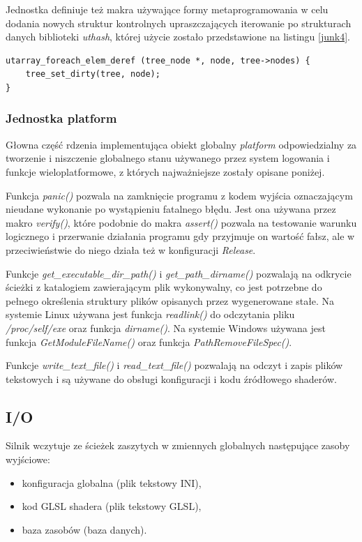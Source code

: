 Jednostka definiuje też makra używające formy metaprogramowania w celu dodania nowych struktur kontrolnych \cite{METACONTROLC} upraszczających iterowanie po strukturach danych biblioteki \textit{uthash}, której użycie zostało przedstawione na listingu \ref{junk4}.
\lstset{language=C}
\begin{lstlisting}[caption={Przykład iteracji używając makra utarray\_foreach\_elem\_deref},captionpos=b,label={junk4}]
utarray_foreach_elem_deref (tree_node *, node, tree->nodes) {
	tree_set_dirty(tree, node);
}
\end{lstlisting}


\subsubsection{Jednostka platform}
Głowna część rdzenia implementująca obiekt globalny \textit{platform} odpowiedzialny za tworzenie i niszczenie globalnego stanu używanego przez system logowania i funkcje wieloplatformowe, z których najważniejsze zostały opisane poniżej.

Funkcja \textit{panic()} pozwala na zamknięcie programu z kodem wyjścia oznaczającym nieudane wykonanie po wystąpieniu fatalnego błędu.
Jest ona używana przez makro \textit{verify()}, które podobnie do makra \textit{assert()} pozwala na testowanie warunku logicznego i przerwanie działania programu gdy przyjmuje on wartość fałsz, ale w przeciwieństwie do niego działa też w konfiguracji \textit{Release}.

Funkcje \textit{get\_executable\_dir\_path()} i \textit{get\_path\_dirname()} pozwalają na odkrycie ścieżki z katalogiem zawierającym plik wykonywalny, co jest potrzebne do pełnego określenia struktury plików opisanych przez wygenerowane stałe.
Na systemie Linux używana jest funkcja \textit{readlink()} do odczytania pliku \textit{/proc/self/exe}
oraz funkcja \textit{dirname()}.
Na systemie Windows używana jest funkcja \textit{GetModuleFileName()} oraz funkcja \textit{PathRemoveFileSpec()}.

Funkcje \textit{write\_text\_file()} i \textit{read\_text\_file()} pozwalają na odczyt i zapis plików tekstowych i są używane do obsługi konfiguracji i kodu źródłowego shaderów.

\subsection{I/O}

Silnik wczytuje ze ścieżek zaszytych w zmiennych globalnych następujące zasoby wyjściowe:
\begin{itemize}
	\item konfiguracja globalna (plik tekstowy INI),
	\item kod GLSL shadera (plik tekstowy GLSL),
	\item baza zasobów (baza danych).
\end{itemize}


